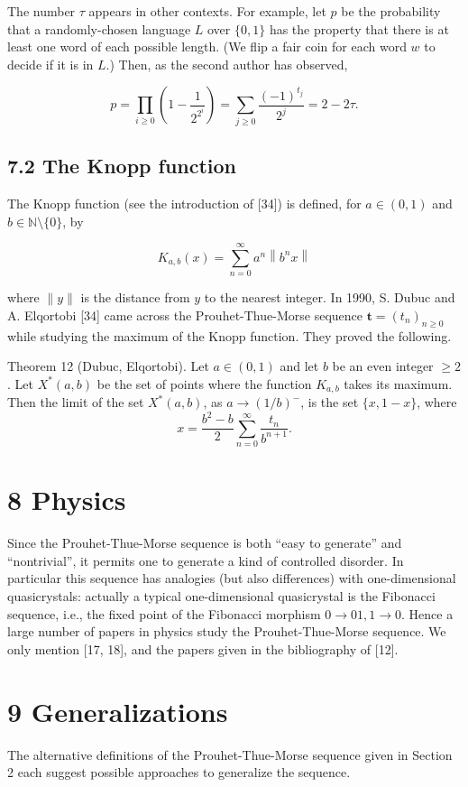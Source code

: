 \documentclass[10pt]{article}
\begin{document}
The number $\tau$ appears in other contexts. For example, let $p$ be the probability that a randomly-chosen language $L$ over $\{0,1\}$ has the property that there is at least one word of each possible length. (We flip a fair coin for each word $w$ to decide if it is in $L$.) Then, as the second author has observed,

\[
p=\prod_{i \geq 0}\left(1-\frac{1}{2^{2^{i}}}\right)=\sum_{j \geq 0} \frac{(-1)^{t_{j}}}{2^{j}}=2-2\tau.
\]

\subsection*{7.2 The Knopp function}
The Knopp function (see the introduction of [34]) is defined, for $a \in(0,1)$ and $b \in \mathbb{N}\setminus\{0\}$, by

\[
K_{a, b}(x)=\sum_{n=0}^{\infty} a^{n}\left\|b^{n} x\right\|
\]

where $\|y\|$ is the distance from $y$ to the nearest integer. In 1990, S. Dubuc and A. Elqortobi [34] came across the Prouhet-Thue-Morse sequence $\mathbf{t}=\left(t_{n}\right)_{n \geq 0}$ while studying the maximum of the Knopp function. They proved the following.

Theorem 12 (Dubuc, Elqortobi). Let $a \in(0,1)$ and let $b$ be an even integer $\geq 2$. Let $X^{*}(a, b)$ be the set of points where the function $K_{a, b}$ takes its maximum. Then the limit of the set $X^{*}(a,b)$, as $a\to(1/b)^-$, is the set $\{x,1-x\}$, where
\[
x=\frac{b^2-b}{2}\sum_{n=0}^{\infty}\frac{t_n}{b^{n+1}}.
\]

\section*{8 Physics}
Since the Prouhet-Thue-Morse sequence is both ``easy to generate'' and ``nontrivial'', it permits one to generate a kind of controlled disorder. In particular this sequence has analogies (but also differences) with one-dimensional quasicrystals: actually a typical one-dimensional quasicrystal is the Fibonacci sequence, i.e., the fixed point of the Fibonacci morphism $0 \rightarrow 01,1 \rightarrow 0$. Hence a large number of papers in physics study the Prouhet-Thue-Morse sequence. We only mention [17, 18], and the papers given in the bibliography of [12].

\section*{9 Generalizations}
The alternative definitions of the Prouhet-Thue-Morse sequence given in Section 2 each suggest possible approaches to generalize the sequence.
\end{document}
